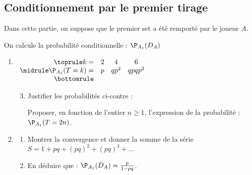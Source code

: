 \documentclass[12pt]{article}
\begin{document}
\subsection{Conditionnement par le premier tirage}
Dans cette partie, on suppose que le premier set a été remporté par le joueur $A$. 

On calcule la probabilité conditionnelle : \quad $\P_{A_1}(D_A)$

\begin{enumerate}[resume]
  \item
    \vspace{-3\baselineskip}

    \begin{objetGauche}[-.5\baselineskip]
      $
      \begin{array}[t]{rccc}
        \toprule
        k=             & 2 & 4    & 6      \\
        \midrule
        \P_{A_1}(T=k)= & p & qp^2 & qpqp^2 \\
        \bottomrule
      \end{array}
      $
      \finObjet
      \begin{enumerate}[resume]
          \setcounter{enumii}{2}
        \item Justifier les probabilités ci-contre :

          Proposer, en fonction de l'entier $n\ge 1$, l'expression de la probabilité : \quad $\P_{A_1}(T=2n)$.
      \end{enumerate}
    \end{objetGauche}
    \moinsLigne
  \item
    \begin{enumerate}
      \item Montrer la convergence et donner la somme de la série \quad $S = 1 + pq + (pq)^2 + (pq)^3 + \ldots$
      \item En déduire que : \quad $\P_{A_1}(D_{A}) = \frac{p}{1-pq}$.
    \end{enumerate}
\end{enumerate}
\moinsLigne
\end{document}
